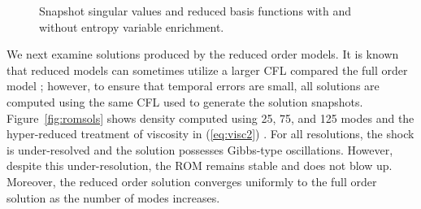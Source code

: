 \documentclass[preprint,10pt]{elsarticle}
\theoremstyle{definition}
\theoremstyle{lemma}
\theoremstyle{theorem}
\theoremstyle{assumption}
\newcommand{\bnote}[1]{{\color{blue}{#1}}}
\begin{document}
\begin{figure}
\centering
{}
\hspace{.02em}
\hspace{.02em}
\caption{Snapshot singular values and reduced basis functions with and without entropy variable enrichment. }
\label{fig:svd}
\end{figure}

We next examine solutions produced by the reduced order models.  It is known that reduced models can sometimes utilize a larger CFL compared the full order model \cite{lucia2004reduced, knezevic2011reduced}; however, to ensure that temporal errors are small, all solutions are computed using the same CFL used to generate the solution snapshots.  Figure~\ref{fig:romsols} shows density computed using 25, 75, and 125 modes and the hyper-reduced treatment of viscosity in (\ref{eq:visc2}) \bnote{using $\epsilon = 2e-4$}.  For all resolutions, the shock is under-resolved and the solution possesses Gibbs-type oscillations.  However, despite this under-resolution, the ROM remains stable and does not blow up.  Moreover, the reduced order solution converges uniformly to the full order solution as the number of modes increases.  
\end{document}
